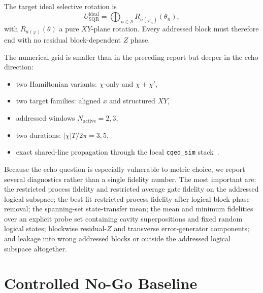 \documentclass[aps,pra,twocolumn,reprint,floatfix,amsmath,amssymb]{revtex4-2}
\begin{document}
The target ideal selective rotation is
\begin{equation}
U_{\mathrm{SQR}}^{\mathrm{ideal}}=\bigoplus_{n\in\mathcal S}R_{\hat n(\varphi_n)}(\theta_n),
\end{equation}
with \(R_{\hat n(\varphi)}(\theta)\) a pure \(XY\)-plane rotation. Every addressed block must therefore end with no residual block-dependent \(Z\) phase.

The numerical grid is smaller than in the preceding report but deeper in the echo direction:
\begin{itemize}
  \item two Hamiltonian variants: \(\chi\)-only and \(\chi+\chi'\),
  \item two target families: aligned \(x\) and structured \(XY\),
  \item addressed windows \(N_{\mathrm{active}}=2,3\),
  \item two durations: \(|\chi|T/2\pi=3,5\),
  \item exact shared-line propagation through the local \texttt{cqed\_sim} stack~\cite{cqed_sim}.
\end{itemize}

Because the echo question is especially vulnerable to metric choice, we report several diagnostics rather than a single fidelity number. The most important are: the restricted process fidelity and restricted average gate fidelity on the addressed logical subspace; the best-fit restricted process fidelity after logical block-phase removal; the spanning-set state-transfer mean; the mean and minimum fidelities over an explicit probe set containing cavity superpositions and fixed random logical states; blockwise residual-\(Z\) and transverse error-generator components; and leakage into wrong addressed blocks or outside the addressed logical subspace altogether.

\section{Controlled No-Go Baseline}
\label{sec:nogo}
\end{document}
